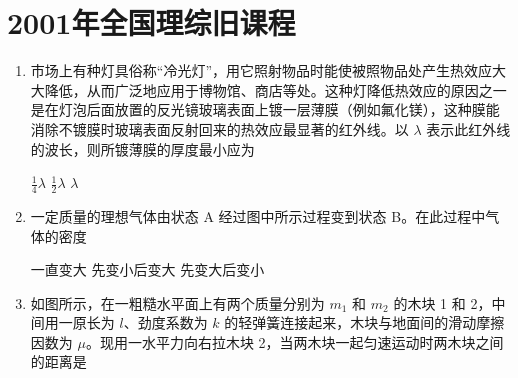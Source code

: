 \documentclass[\gkver]{gaokaozhenti}
\begin{document}
\chapter{2001年全国理综旧课程}

\begin{enumerate}
\item
市场上有种灯具俗称“冷光灯”，用它照射物品时能使被照物品处产生热效应大大降低，从而广泛地应用于博物馆、商店等处。这种灯降低热效应的原因之一是在灯泡后面放置的反光镜玻璃表面上镀一层薄膜（例如氟化镁），这种膜能消除不镀膜时玻璃表面反射回来的热效应最显著的红外线。以 $\lambda$ 表示此红外线的波长，则所镀薄膜的厚度最小应为

{$\frac{1}{4}\lambda$}
{$\frac{1}{2}\lambda$}
{$\lambda$}


\item
一定质量的理想气体由状态 A 经过图中所示过程变到状态 B。在此过程中气体的密度

\onepicture[w=3.05cm]{}

{一直变大}
{先变小后变大}
{先变大后变小}


\item
如图所示，在一粗糙水平面上有两个质量分别为 $m_{1}$ 和 $m_{2}$ 的木块 1 和 2，中间用一原长为 $l$、劲度系数为 $k$ 的轻弹簧连接起来，木块与地面间的滑动摩擦因数为 $\mu$。现用一水平力向右拉木块 2，当两木块一起匀速运动时两木块之间的距离是


\end{enumerate}
\end{document}
